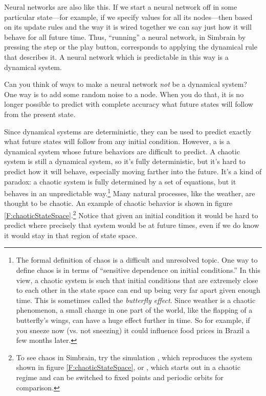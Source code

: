 Neural networks are also like this. If we start a neural network off in some particular state---for example, if we specify values for all its nodes---then based on its
update rules and the way it is wired together we can say just how it will behave for
all future time. Thus, ``running'' a neural network, in Simbrain by pressing
the step or the play button, corresponds to applying the dynamical rule that
describes it. A neural network which is predictable in this way is a dynamical
system.

Can you think of ways to make a neural network {\em not} be a dynamical
system?  One way is to add some random noise to a node. When you do that, it
is no longer possible to predict with complete accuracy what future states will follow from the present state.

Since dynamical systems are deterministic, they can be used to predict exactly what future states will follow from any initial condition. However, a  is a dynamical system whose future behaviors are difficult to predict. A chaotic system is still a dynamical system, so it's fully deterministic, but it's hard to predict how it will behave, especially moving farther into the future. It's a kind of paradox: a chaotic system is fully determined by a set of equations, but it behaves in an unpredictable way.\footnote{The formal definition of chaos is a difficult and unresolved topic. One way to define chaos is in terms of ``sensitive dependence on initial conditions.'' In this view, a chaotic system is such that initial conditions that are extremely close to each other in the state space can end up being very far apart given enough time. This is sometimes called the \emph{butterfly effect}. Since weather is a chaotic phenomenon, a small change in one part of the world, like the flapping of a butterfly's wings, can have a huge effect further in time. So for example, if you sneeze now (vs. not sneezing) it could influence food prices in Brazil a few months later.} Many natural processes, like the weather, are thought to be chaotic. An example of chaotic behavior is shown in figure \ref{F:chaoticStateSpace}.\footnote{To see chaos in Simbrain, try the simulation , which reproduces the system shown in figure \ref{F:chaoticStateSpace}, or , which starts out in a chaotic regime and can be switched to fixed points and periodic orbits for comparison.} Notice that given an initial condition it would be hard to predict where precisely that system would be at future times, even if we do know it would stay in that region of state space.

